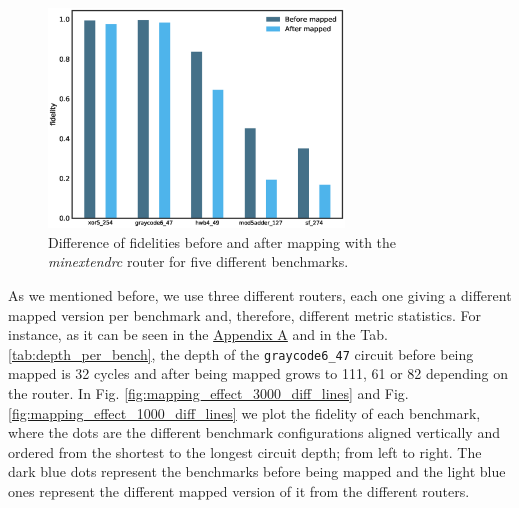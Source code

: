 \begin{figure}[htbp]
\centering
\includegraphics[width=0.7\textwidth]{figures/f_diff_bar_plot.eps}
\caption{\label{fig:f_diff_bar_plot}
Difference of fidelities before and after mapping with the \emph{minextendrc} router for five different benchmarks.}
\end{figure}
As we mentioned before, we use three different routers, each one giving a different mapped version per benchmark and, therefore, different metric statistics.
For instance, as it can be seen in the \href{appendix-1.org}{Appendix A} and in the Tab. \ref{tab:depth_per_bench}, the depth of the \texttt{graycode6\_47} circuit before being mapped is 32 cycles and after being mapped grows to 111, 61 or 82 depending on the router.
In Fig. \ref{fig:mapping_effect_3000_diff_lines} and Fig. \ref{fig:mapping_effect_1000_diff_lines} we plot the fidelity of each benchmark, where the dots are the different benchmark configurations aligned vertically and ordered from the shortest to the longest circuit depth; from left to right.
The dark blue dots represent the benchmarks before being mapped and the light blue ones represent the different mapped version of it from the different routers.




